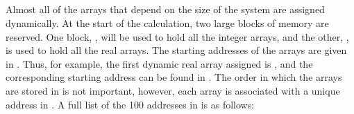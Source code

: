 \subsection*{}
Almost all of the arrays that depend on the size of the system  are assigned
dynamically.  At the start of the calculation, two large blocks of memory are
reserved. One block, , will be used to hold all the integer arrays,
and the other, ,  is used to hold all the real arrays. The starting
addresses of the arrays are given in . Thus, for example, the
first dynamic real array assigned is , and the corresponding starting
address can be found in .  The order in which the arrays are
stored in  is not important, however, each array is associated with
a unique address in .  A full list of the 100 addresses in 
 is as follows:

